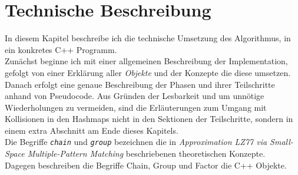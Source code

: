\chapter{Technische Beschreibung}
In diesem Kapitel beschreibe ich die technische Umsetzung des Algorithmus, in ein konkretes C++ Programm.\\
Zunächst beginne ich mit einer allgemeinen Beschreibung der Implementation, gefolgt von einer Erklärung aller \textit{Objekte} und der Konzepte die diese umsetzen. Danach erfolgt eine genaue Beschreibung der Phasen und ihrer Teilschritte anhand von Pseudocode. Aus Gründen der Lesbarkeit und um unnötige Wiederholungen zu vermeiden, sind die Erläuterungen zum Umgang mit Kollisionen in den Hashmaps nicht in den Sektionen der Teilschritte, sondern in einem extra Abschnitt am Ende dieses Kapitels.\\
Die Begriffe \textit{\texttt{chain}}  und \textit{\texttt{group}} bezeichnen die in {\it Approximation LZ77 via Small-Space Multiple-Pattern Matching} beschriebenen theoretischen Konzepte.  \\
Dagegen beschreiben die Begriffe  Chain, Group und Factor  die C++ Objekte.

